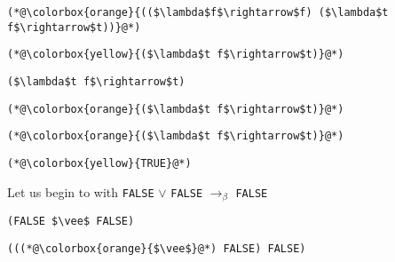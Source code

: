 \documentclass{beamer}
\begin{document}
\begin{frame}[fragile]{\CurrentSection}
\lstset{basicstyle=\ttfamily\small}\lstset{numbers=none}\lstset{language=ML}\begin{lstlisting}
(*@\colorbox{orange}{(($\lambda$f$\rightarrow$f) ($\lambda$t f$\rightarrow$t))}@*)
\end{lstlisting}
\pause\lstset{language=ML}\begin{lstlisting}
(*@\colorbox{yellow}{($\lambda$t f$\rightarrow$t)}@*)
\end{lstlisting}

\end{frame}

\begin{frame}[fragile]{\CurrentSection}
\lstset{basicstyle=\ttfamily\small}\lstset{numbers=none}\lstset{language=ML}\begin{lstlisting}
($\lambda$t f$\rightarrow$t)
\end{lstlisting}
\pause\lstset{language=ML}\begin{lstlisting}
(*@\colorbox{orange}{($\lambda$t f$\rightarrow$t)}@*)
\end{lstlisting}

\end{frame}

\begin{frame}[fragile]{\CurrentSection}
\lstset{basicstyle=\ttfamily\small}\lstset{numbers=none}\lstset{language=ML}\begin{lstlisting}
(*@\colorbox{orange}{($\lambda$t f$\rightarrow$t)}@*)
\end{lstlisting}
\pause\lstset{language=ML}\begin{lstlisting}
(*@\colorbox{yellow}{TRUE}@*)
\end{lstlisting}

\end{frame}

\begin{frame}[fragile]{\CurrentSection}
\begin{block}{\CurrentSubSection}
Let us begin to with \texttt{FALSE} $\vee$ \texttt{FALSE} $\rightarrow_\beta$ \texttt{FALSE}
\end{block}


\end{frame}

\begin{frame}[fragile]{\CurrentSection}
\lstset{basicstyle=\ttfamily\small}\lstset{numbers=none}\lstset{language=ML}\begin{lstlisting}
(FALSE $\vee$ FALSE)
\end{lstlisting}
\pause\lstset{language=ML}\begin{lstlisting}
(((*@\colorbox{orange}{$\vee$}@*) FALSE) FALSE)
\end{lstlisting}

\end{frame}
\end{document}
